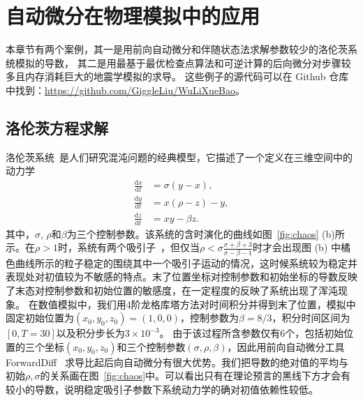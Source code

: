 \documentclass[A4,twoside,UTF8]{ctexart}
\def\D{\mathrm{d}}
\begin{document}
\section{自动微分在物理模拟中的应用}\label{sec:applications}
本章节有两个案例，其一是用前向自动微分和伴随状态法求解参数较少的洛伦茨系统模拟的导数，
其二是用最基于最优检查点算法和可逆计算的后向微分对步骤较多且内存消耗巨大的地震学模拟的求导。
这些例子的源代码可以在 Github 仓库中找到：\href{https://github.com/GiggleLiu/WuLiXueBao}{https://github.com/GiggleLiu/WuLiXueBao}。

\subsection{洛伦茨方程求解}
洛伦茨系统~\cite{Lorenz1963}是人们研究混沌问题的经典模型，它描述了一个定义在三维空间中的动力学
\begin{align*}
    \frac{\D x}{\D t} &= \sigma(y - x),\\
    \frac{\D y}{\D t} &= x(\rho -z) - y,\\
    \frac{\D z}{\D t} &= xy-\beta z.
\end{align*}
其中，$\sigma$, $\rho$和$\beta$为三个控制参数。该系统的含时演化的曲线如图~\ref{fig:chaos} (b)所示。在$\rho>1$时，系统有两个吸引子~\cite{Hirsch2012}，但仅当$\rho < \sigma \frac{\sigma + \beta + 3}{\sigma - \beta - 1}$时才会出现图 (b) 中橘色曲线所示的粒子稳定的围绕其中一个吸引子运动的情况，这时候系统较为稳定并表现处对初值较为不敏感的特点。末了位置坐标对控制参数和初始坐标的导数反映了末态对控制参数和初始位置的敏感度，在一定程度的反映了系统出现了浑沌现象。
在数值模拟中，我们用4阶龙格库塔方法对时间积分并得到末了位置，模拟中固定初始位置为$(x_0,y_0,z_0) = (1, 0, 0)$，控制参数为$\beta=8/3$，积分时间区间为$[0,T=30]$以及积分步长为$3\times 10^{-3}$。
由于该过程所含参数仅有6个，包括初始位置的三个坐标$(x_0, y_0, z_0)$和三个控制参数$(\sigma, \rho,\beta)$，因此用前向自动微分工具 ForwardDiff~\cite{Revels2016} 求导比起后向自动微分有很大优势。我们把导数的绝对值的平均与初始$\rho,\sigma$的关系画在图~\ref{fig:chaos}中。可以看出只有在理论预言的黑线下方才会有较小的导数，说明稳定吸引子参数下系统动力学的确对初值依赖性较低。
\end{document}
